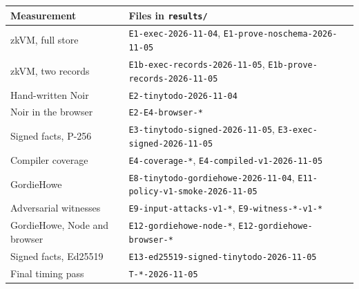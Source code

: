 \documentclass[11pt]{article}
\begin{document}
\begin{center}
\footnotesize
\begin{tabular}{@{}ll@{}}
\toprule
Measurement & Files in \texttt{results/} \\
\midrule
zkVM, full store & \texttt{E1-exec-2026-11-04}, \texttt{E1-prove-noschema-2026-11-05} \\
zkVM, two records & \texttt{E1b-exec-records-2026-11-05}, \texttt{E1b-prove-records-2026-11-05} \\
Hand-written Noir & \texttt{E2-tinytodo-2026-11-04} \\
Noir in the browser & \texttt{E2-E4-browser-*} \\
Signed facts, P-256 & \texttt{E3-tinytodo-signed-2026-11-05}, \texttt{E3-exec-signed-2026-11-05} \\
Compiler coverage & \texttt{E4-coverage-*}, \texttt{E4-compiled-v1-2026-11-05} \\
GordieHowe & \texttt{E8-tinytodo-gordiehowe-2026-11-04}, \texttt{E11-policy-v1-smoke-2026-11-05} \\
Adversarial witnesses & \texttt{E9-input-attacks-v1-*}, \texttt{E9-witness-*-v1-*} \\
GordieHowe, Node and browser &\texttt{E12-gordiehowe-node-*}, \texttt{E12-gordiehowe-browser-*} \\
Signed facts, Ed25519 & \texttt{E13-ed25519-signed-tinytodo-2026-11-05} \\
Final timing pass & \texttt{T-*-2026-11-05} \\
\bottomrule
\end{tabular}
\end{center}



\end{document}
